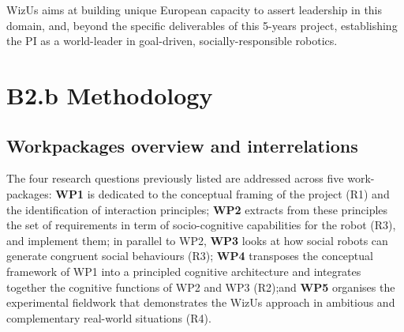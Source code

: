 \documentclass[11pt,a4paper]{report}
\newcommand{\project}{WizUs\xspace}
\newcommand{\eu}[1]{}
\begin{document}
\project aims at building unique European capacity to assert leadership in this
domain, and, beyond the specific deliverables of this 5-years project,
establishing the PI as a world-leader in goal-driven, socially-responsible
robotics.




{\let\clearpage\relax\chapter{B2.b Methodology}\label{research-methodology}} %

\eu{Describe the proposed methodology in detail including any key intermediate
goals. Explain and justify the methodology in relation to the state of the art,
and particularly novel or unconventional aspects addressing the
'high-risk/high-gain' balance. Highlight any intermediate stages where results
may require adjustments to the project planning. In case you ask that team
members are engaged by another host institution their participation has to be
fully justified by the scientific added value they bring to the project.}


\section{Workpackages overview and interrelations}\label{workpackage-interrelations}


The four research questions previously listed are addressed across five
work-packages: \textbf{WP1} is dedicated to the conceptual framing of the
project (R1) and the identification of interaction principles; \textbf{WP2}
extracts from these principles the set of requirements in term of
socio-cognitive capabilities for the robot (R3), and implement them; in parallel
to WP2,  \textbf{WP3} looks at how social robots can generate congruent social
behaviours (R3); \textbf{WP4} transposes the conceptual framework of WP1 into a
principled cognitive architecture and integrates together the cognitive
functions of WP2 and WP3 (R2);and \textbf{WP5} organises the experimental
fieldwork that demonstrates the \project approach in ambitious and complementary
real-world situations (R4).
\end{document}
